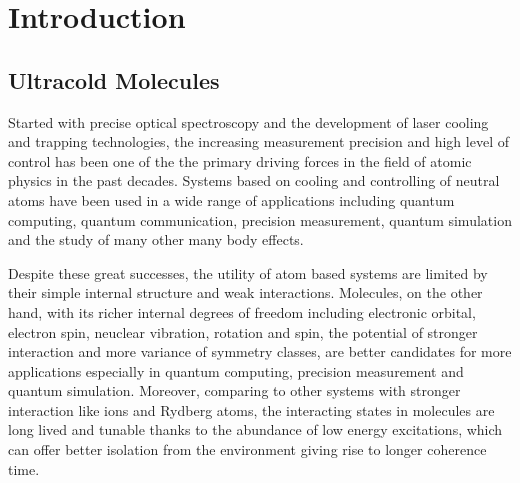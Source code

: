 
\chapter{Introduction}
\label{ch:introduction}

\section{Ultracold Molecules}
\label{ch:introduction:molecules}

Started with precise optical spectroscopy and the development of laser cooling
and trapping technologies, the increasing measurement precision and
high level of control has been one of the the primary driving forces
in the field of atomic physics in the past decades.
Systems based on cooling and controlling of neutral atoms
have been used in a wide range of applications including
quantum computing, quantum communication, precision measurement,
quantum simulation and the study of many other many body effects.

Despite these great successes, the utility of atom based systems
are limited by their simple internal structure and weak interactions.
Molecules, on the other hand, with its richer internal degrees of freedom
including electronic orbital, electron spin, neuclear vibration, rotation and spin,
the potential of stronger interaction and more variance of symmetry classes,
are better candidates for more applications especially in
quantum computing, precision measurement and quantum simulation.
Moreover, comparing to other systems with stronger interaction like ions and Rydberg atoms,
the interacting states in molecules are long lived and tunable thanks to
the abundance of low energy excitations,
which can offer better isolation from the environment giving rise to longer coherence time.

